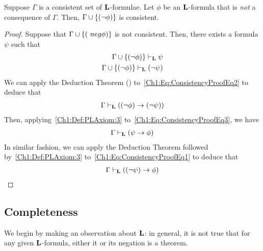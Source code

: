 \begin{boxproposition}\label{Ch1:Prop:ConsistencyUnion}
    Suppose $\Gamma$ is a consistent set of $\mathbf{L}$-formulae. Let $\phi$ be an $\mathbf{L}$-formula that is \emph{not} a consequence of $\Gamma$. Then, $\Gamma \cup \left\{ \left( \neg \phi \right) \right\}$ is consistent.
\end{boxproposition}
\begin{proof}
    Suppose that $\Gamma \cup \left\{ \left( \ neg \phi \right) \right\}$ is not consistent. Then, there exists a formula $\psi$ such that
    \begin{align}
        \Gamma \cup \left\{ \left( \neg \phi \right) \right\} \vdash_{\mathbf{L}} \psi
        \label{Ch1:Eq:ConsistencyProofEq1} \\
        \Gamma \cup \left\{ \left( \neg \phi \right) \right\} \vdash_{\mathbf{L}} \left( \neg \psi \right)
        \label{Ch1:Eq:ConsistencyProofEq2}
    \end{align}
    We can apply the Deduction Theorem () to~\eqref{Ch1:Eq:ConsistencyProofEq2} to deduce that
    \begin{align}
        \Gamma \vdash_{\mathbf{L}} \left( \left( \neg \phi \right) \to \left( \neg \psi \right) \right)
        \label{Ch1:Eq:ConsistencyProofEq3}
    \end{align}
    Then, applying~\ref{Ch1:Def:PLAxiom:3} to~\eqref{Ch1:Eq:ConsistencyProofEq3}, we have
    \begin{align}
        \Gamma \vdash_{\mathbf{L}} \left( \psi \to \phi \right)
        \label{Ch1:Eq:ConsistencyProofEq4}
    \end{align}
    In similar fashion, we can apply the Deduction Theorem followed by~\ref{Ch1:Def:PLAxiom:3} to~\eqref{Ch1:Eq:ConsistencyProofEq1} to deduce that
    \begin{align}
        \Gamma \vdash_{\mathbf{L}} \left( \left( \neg \psi \right) \to \phi \right)
        \label{Ch1:Eq:ConsistencyProofEq5}
    \end{align}
    \sorry %
\end{proof}

\subsection{Completeness}

We begin by making an observation about $\mathbf{L}$: in general, it is not true that for any given $\mathbf{L}$-formula, either it or its negation is a theorem.


